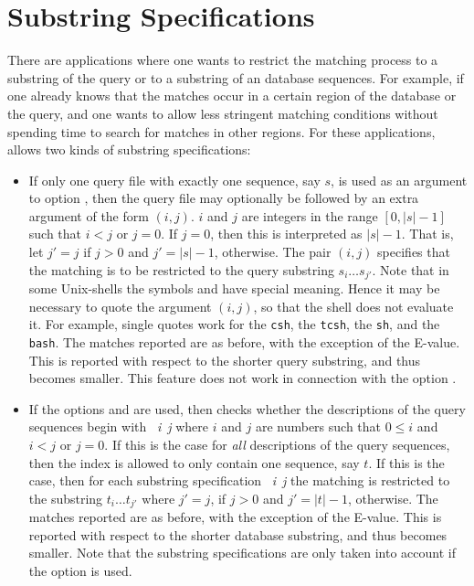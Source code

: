 \documentclass[12pt,titlepage]{article}
\newcommand{\Size}[1]{|#1|}
\begin{document}
\section{Substring Specifications}\label{Substringspecifications}
There are applications where one wants to restrict the matching process
to a substring of the query or to a substring of an database sequences.
For example, if one already knows that the matches occur in a certain region
of the database or the query, and one wants to allow less stringent matching
conditions without spending time to search for matches in other
regions. For these applications, \VM allows two kinds of substring
specifications:
\begin{itemize}
\item
If only one query file with exactly one sequence, say \(s\), is used as an 
argument to option , then the query file may optionally be 
followed by an extra argument of the form \((i,j)\). \(i\) and \(j\)
are integers in the range \([0,\Size{s}-1]\) such that 
\(i<j\) or \(j=0\).  If \(j=0\), then this is interpreted as \(\Size{s}-1\). 
That is, let \(j'=j\) if \(j>0\) and \(j'=\Size{s}-1\), otherwise.
The pair \((i,j)\) specifies that the matching is to be restricted to 
the query substring \(s_{i}\ldots s_{j'}\). Note that in some Unix-shells
the symbols \texttt{} and \texttt{} have special
meaning. Hence it may be necessary to quote the argument 
\((i,j)\), so that the shell does not evaluate it. For example,
single quotes work for the \texttt{csh}, the \texttt{tcsh}, the
\texttt{sh}, and the \texttt{bash}.
The matches reported are as before, with the exception of the E-value. 
This is reported with respect to the shorter query substring, and thus becomes
smaller. This feature does not work in connection with the option 
.
\item
If the options  and  are used, then \VM 
checks whether the descriptions of the query sequences begin with 
\texttt{}~\textit{i}~\textit{j}
where \(i\) and \(j\) are numbers such that \(0\leq i\) and \(i<j\) or \(j=0\).
If this is the case for \emph{all} descriptions of the query sequences, then 
the index 
is allowed to only contain one sequence, say \(t\). If this is the case, 
then for each substring specification 
\texttt{}~\textit{i}~\textit{j}
the matching is restricted to the substring \(t_{i}\ldots t_{j'}\) where
\(j'=j\), if \(j>0\) and \(j'=\Size{t}-1\), otherwise.
The matches reported are as before, with the exception of the E-value. 
This is reported with respect to the shorter database substring, and thus 
becomes smaller. Note that the substring specifications are only taken
into account if the option  is used.
\end{itemize}
\end{document}
